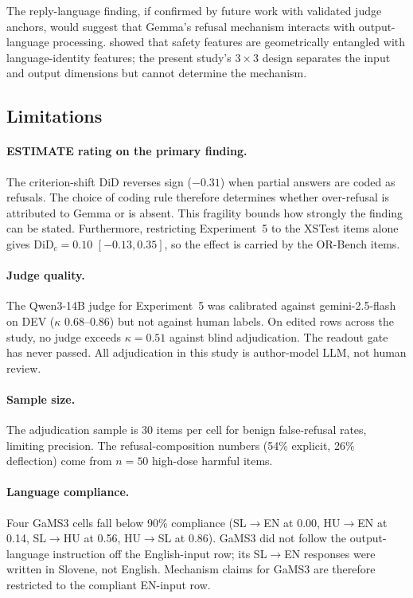 \documentclass[11pt,letterpaper]{article}
\begin{document}
The reply-language finding, if confirmed by future work with validated judge anchors, would suggest that Gemma's refusal mechanism interacts with output-language processing.
\citet{Upadhyaya2026} showed that safety features are geometrically entangled with language-identity features; the present study's $3{\times}3$ design separates the input and output dimensions but cannot determine the mechanism.

\subsection{Limitations}

\paragraph{ESTIMATE rating on the primary finding.}
The criterion-shift DiD reverses sign ($-0.31$) when partial answers are coded as refusals.
The choice of coding rule therefore determines whether over-refusal is attributed to Gemma or is absent.
This fragility bounds how strongly the finding can be stated.
Furthermore, restricting Experiment~5 to the XSTest items alone gives $\mathrm{DiD}_c = 0.10$ $[-0.13, 0.35]$, so the effect is carried by the OR-Bench items.

\paragraph{Judge quality.}
The Qwen3-14B judge for Experiment~5 was calibrated against gemini-2.5-flash on DEV ($\kappa$ 0.68--0.86) but not against human labels.
On edited rows across the study, no judge exceeds $\kappa = 0.51$ against blind adjudication.
The readout gate has never passed.
All adjudication in this study is author-model LLM, not human review.

\paragraph{Sample size.}
The adjudication sample is 30 items per cell for benign false-refusal rates, limiting precision.
The refusal-composition numbers (54\% explicit, 26\% deflection) come from $n = 50$ high-dose harmful items.

\paragraph{Language compliance.}
Four GaMS3 cells fall below 90\% compliance (SL$\to$EN at 0.00, HU$\to$EN at 0.14, SL$\to$HU at 0.56, HU$\to$SL at 0.86).
GaMS3 did not follow the output-language instruction off the English-input row; its SL$\to$EN responses were written in Slovene, not English.
Mechanism claims for GaMS3 are therefore restricted to the compliant EN-input row.
\end{document}
